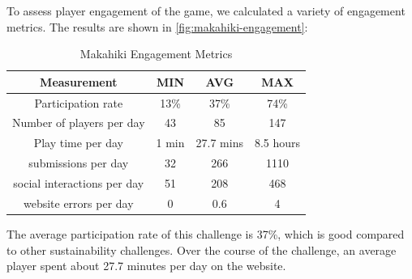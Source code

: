 \documentclass{sigchi}
\newcommand\tabhead[1]{\small\textbf{#1}}
\begin{document}
To assess player engagement of the game, we calculated a variety of engagement
metrics. The results are shown in \autoref{fig:makahiki-engagement}:

\begin{table}
  \centering
  \begin{tabular}{|c|c|c|c}
    \hline
    \multicolumn{1}{|p{0.5\columnwidth}|}{\centering\tabhead{Measurement}} &
    \multicolumn{1}{|p{0.1\columnwidth}|}{\centering\tabhead{MIN}} &
    \multicolumn{1}{|p{0.1\columnwidth}|}{\centering\tabhead{AVG}} &
    \multicolumn{1}{|p{0.1\columnwidth}|}{\centering\tabhead{MAX}} \\
    \hline
    \multicolumn{1}{|p{0.5\columnwidth}|}{Participation rate} &
    \multicolumn{1}{|p{0.1\columnwidth}|}{13\%} &
    \multicolumn{1}{|p{0.1\columnwidth}|}{37\%} &
    \multicolumn{1}{|p{0.1\columnwidth}|}{74\%} \\
    \hline
    \multicolumn{1}{|p{0.5\columnwidth}|}{Number of players per day} &
    \multicolumn{1}{|p{0.1\columnwidth}|}{43} &
    \multicolumn{1}{|p{0.1\columnwidth}|}{85} &
    \multicolumn{1}{|p{0.1\columnwidth}|}{147} \\
    \hline
    \multicolumn{1}{|p{0.5\columnwidth}|}{Play time per day} &
    \multicolumn{1}{|p{0.1\columnwidth}|}{1 min} &
    \multicolumn{1}{|p{0.1\columnwidth}|}{27.7 mins} &
    \multicolumn{1}{|p{0.1\columnwidth}|}{8.5 hours} \\
    \hline
    \multicolumn{1}{|p{0.5\columnwidth}|}{submissions per day} &
    \multicolumn{1}{|p{0.1\columnwidth}|}{32} &
    \multicolumn{1}{|p{0.1\columnwidth}|}{266} &
    \multicolumn{1}{|p{0.1\columnwidth}|}{1110} \\
    \hline
    \multicolumn{1}{|p{0.5\columnwidth}|}{social interactions per day} &
    \multicolumn{1}{|p{0.1\columnwidth}|}{51} &
    \multicolumn{1}{|p{0.1\columnwidth}|}{208} &
    \multicolumn{1}{|p{0.1\columnwidth}|}{468} \\
    \hline
    \multicolumn{1}{|p{0.5\columnwidth}|}{website errors per day} &
    \multicolumn{1}{|p{0.1\columnwidth}|}{0} &
    \multicolumn{1}{|p{0.1\columnwidth}|}{0.6} &
    \multicolumn{1}{|p{0.1\columnwidth}|}{4} \\
    \hline
  \end{tabular}
  \caption{Makahiki Engagement Metrics}
  \label{fig:makahiki-engagement}
\end{table}

The average participation rate of this challenge is 37\%, which is good compared to other
sustainability challenges. Over the course of the challenge, an average player spent about
27.7 minutes per day on the website.
\end{document}
